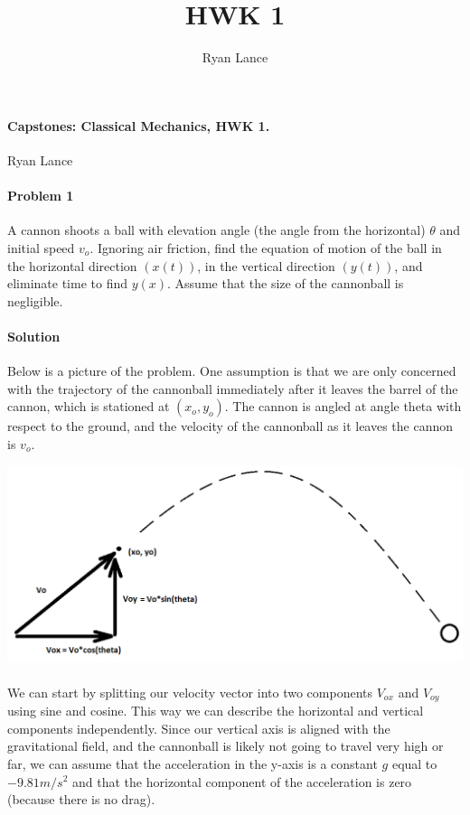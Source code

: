 \documentclass[11pt,a4paper]{report}
\author{Ryan Lance}
\title{HWK 1}
\begin{document}
\paragraph{Capstones: Classical Mechanics, HWK 1.} Ryan Lance
\paragraph{Problem 1} A cannon shoots a ball with elevation angle (the angle from the horizontal) $\theta$ and initial speed $v_o$. Ignoring air friction, find the equation of motion of the ball in the horizontal direction $(x(t))$, in the vertical direction $(y(t))$, and eliminate time to find $y(x)$. Assume that the size of the cannonball is negligible.
\paragraph{Solution} Below is a picture of the problem. One assumption is that we are only concerned with the trajectory of the cannonball immediately after it leaves the barrel of the cannon, which is stationed at $(x_o, y_o)$. The cannon is angled at angle theta with respect to the ground, and the velocity of the cannonball as it leaves the cannon is $v_o$. 

\includegraphics[scale=0.4]{pic1}
\paragraph{} We can start by splitting our velocity vector into two components $V_{ox}$ and $V_{oy}$ using sine and cosine. This way we can describe the horizontal and vertical components independently. Since our vertical axis is aligned with the gravitational field, and the cannonball is likely not going to travel very high or far, we can assume that the acceleration in the y-axis is a constant $g$ equal to $-9.81m/s^2$ and that the horizontal component of the acceleration is zero (because there is no drag). 
\end{document}

